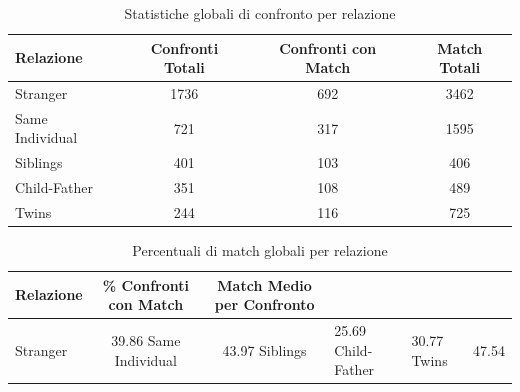 \begin{table}[htbp]
\centering
\caption{Statistiche globali di confronto per relazione}
\label{tab:global_comparisons}
\begin{tabular}{|l|c|c|c|}
\hline
\textbf{Relazione} & \textbf{Confronti Totali} & \textbf{Confronti con Match} & \textbf{Match Totali} \\
\hline
Stranger & 1736 & 692 & 3462 \\
\hline
Same Individual & 721 & 317 & 1595 \\
\hline
Siblings & 401 & 103 & 406 \\
\hline
Child-Father & 351 & 108 & 489 \\
\hline
Twins & 244 & 116 & 725 \\
\hline
\end{tabular}
\end{table}


\begin{table}[htbp]
\centering
\caption{Percentuali di match globali per relazione}
\label{tab:global_percentages}
\begin{tabular}{|l|c|c|}
\hline
\textbf{Relazione} & \textbf{\% Confronti con Match} & \textbf{Match Medio per Confronto} \\
\hline
Stranger & 39.86%
\hline
Same Individual & 43.97%
\hline
Siblings & 25.69%
\hline
Child-Father & 30.77%
\hline
Twins & 47.54%
\hline
\end{tabular}
\end{table}

